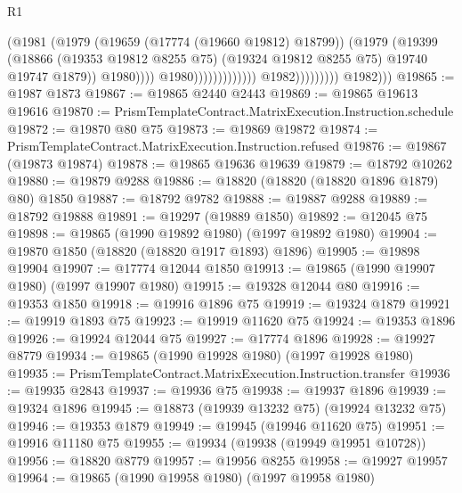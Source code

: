 \begin{lexlean}{R1}
\begin{coremodule}
                                                        (@1981
                                                          (@1979
                                                            (@19659 (@17774 (@19660 @19812) @18799))
                                                            (@1979
                                                              (@19399
                                                                (@18866
                                                                  (@19353 @19812 @8255 @75)
                                                                  (@19324 @19812 @8255 @75)
                                                                  @19740
                                                                  @19747
                                                                  @1879))
                                                              @1980))))
                                                      @1980)))))))))))))
                            @1982)))))))))
          @1982)))
@19865 := @1987 @1873
@19867 := @19865 @2440 @2443
@19869 := @19865 @19613 @19616
@19870 := PrismTemplateContract.MatrixExecution.Instruction.schedule
@19872 := @19870 @80 @75
@19873 := @19869 @19872
@19874 := PrismTemplateContract.MatrixExecution.Instruction.refused
@19876 := @19867 (@19873 @19874)
@19878 := @19865 @19636 @19639
@19879 := @18792 @10262
@19880 := @19879 @9288
@19886 := @18820 (@18820 (@18820 @1896 @1879) @80) @1850
@19887 := @18792 @9782
@19888 := @19887 @9288
@19889 := @18792 @19888
@19891 := @19297 (@19889 @1850)
@19892 := @12045 @75
@19898 := @19865 (@1990 @19892 @1980) (@1997 @19892 @1980)
@19904 := @19870 @1850 (@18820 (@18820 @1917 @1893) @1896)
@19905 := @19898 @19904
@19907 := @17774 @12044 @1850
@19913 := @19865 (@1990 @19907 @1980) (@1997 @19907 @1980)
@19915 := @19328 @12044 @80
@19916 := @19353 @1850
@19918 := @19916 @1896 @75
@19919 := @19324 @1879
@19921 := @19919 @1893 @75
@19923 := @19919 @11620 @75
@19924 := @19353 @1896
@19926 := @19924 @12044 @75
@19927 := @17774 @1896
@19928 := @19927 @8779
@19934 := @19865 (@1990 @19928 @1980) (@1997 @19928 @1980)
@19935 := PrismTemplateContract.MatrixExecution.Instruction.transfer
@19936 := @19935 @2843
@19937 := @19936 @75
@19938 := @19937 @1896
@19939 := @19324 @1896
@19945 := @18873 (@19939 @13232 @75) (@19924 @13232 @75)
@19946 := @19353 @1879
@19949 := @19945 (@19946 @11620 @75)
@19951 := @19916 @11180 @75
@19955 := @19934 (@19938 (@19949 @19951 @10728))
@19956 := @18820 @8779
@19957 := @19956 @8255
@19958 := @19927 @19957
@19964 := @19865 (@1990 @19958 @1980) (@1997 @19958 @1980)

\end{coremodule}
\end{lexlean}
